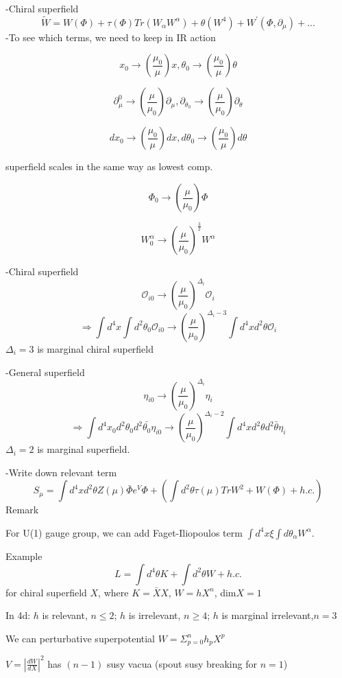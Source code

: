 \documentclass[type = bachelor]{fduthesis-en}
\begin{document}
\noindent-Chiral superfield
\begin{equation}
\widetilde{W}=W(\Phi)+\tau(\Phi)Tr(W_{\alpha}W^{\alpha})+\theta(W^4)+W^{\prime}(\Phi, \partial_{\mu})+...
\end{equation}
-To see which terms, we need to keep in IR action

$$x_0\rightarrow(\frac{\mu_0}{\mu})x, \theta_0\rightarrow(\frac{\mu_0}{\mu})\theta$$

$$\partial^0_{\mu}\rightarrow(\frac{\mu}{\mu_0})\partial_{\mu}, \partial_{\theta_0}\rightarrow(\frac{\mu}{\mu_0})\partial_{\theta}$$

$$dx_0\rightarrow(\frac{\mu_0}{\mu})dx, d\theta_0\rightarrow(\frac{\mu_0}{\mu})d\theta$$

superfield scales in the same way as lowest comp.

$$\Phi_0\rightarrow(\frac{\mu}{\mu_0})\Phi$$

$$W^{\alpha}_0\rightarrow(\frac{\mu}{\mu_0})^{\frac{3}{2}}W^{\alpha}$$

\noindent-Chiral superfield 
$$\mathcal{O}_{i0}\rightarrow(\frac{\mu}{\mu_0})^{\Delta_i}\mathcal{O}_i$$
$$\Rightarrow \int d^4x\int d^2\theta_0\mathcal{O}_{i0}\rightarrow(\frac{\mu}{\mu_0})^{\Delta_i-3}\int d^4x d^2\theta \mathcal{O}_i$$
$\Delta_i=3$ is marginal chiral superfield

\noindent-General superfield 
$$\eta_{i0}\rightarrow(\frac{\mu}{\mu_0})^{\Delta_i}\eta_i$$
$$\Rightarrow \int d^4x_0 d^2\theta_0 d^2\bar{\theta_0}\eta_{i0}\rightarrow(\frac{\mu}{\mu_0})^{\Delta_i-2}\int d^4x d^2\theta d^2\bar{\theta}\eta_i$$
$\Delta_i=2$ is marginal superfield.

\noindent-Write down relevant term
\begin{equation}
S_{\mu}=\int d^4x d^2\theta Z(\mu) \bar{\Phi}e^V\Phi+(\int d^2\theta\dot{\tau}(\mu)TrW^2+W(\Phi)+h.c.)
\end{equation}
Remark

For U(1) gauge group, we can add Faget-Iliopoulos term $\int d^4x \xi \int d\theta_{\alpha}W^{\alpha}$.

\noindent Example
$$L=\int d^4\theta K + \int d^2\theta W + h.c.$$ for chiral superfield $X$, where $K=\bar{X}X$, $W=hX^n$, dim$X=1$

In 4d: $h$ is relevant, $n\leq2$; $h$ is irrelevant, $n\geq4$; $h$ is marginal irrelevant,$n=3$

We can perturbative superpotential $W=\Sigma_{p=0}^nh_pX^p$

$V=\left|\frac{dW}{dX}\right|^2$ has $(n-1)$ susy vacua (spout susy breaking for $n=1$)
\end{document}
